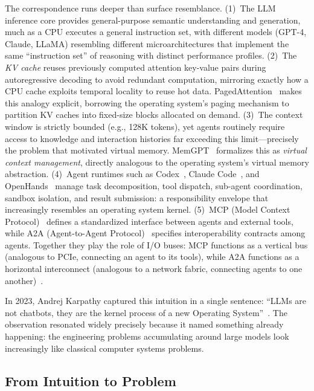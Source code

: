 The correspondence runs deeper than surface resemblance.
(1)~The LLM inference core provides general-purpose semantic understanding and generation, much as a CPU executes a general instruction set, with different models (GPT-4, Claude, LLaMA) resembling different microarchitectures that implement the same ``instruction set'' of reasoning with distinct performance profiles.
(2)~The \emph{KV cache} reuses previously computed attention key-value pairs during autoregressive decoding to avoid redundant computation, mirroring exactly how a CPU cache exploits temporal locality to reuse hot data.
PagedAttention~\cite{kwon2023pagedattention} makes this analogy explicit, borrowing the operating system's paging mechanism to partition KV caches into fixed-size blocks allocated on demand.
(3)~The context window is strictly bounded (e.g., 128K tokens), yet agents routinely require access to knowledge and interaction histories far exceeding this limit---precisely the problem that motivated virtual memory.
MemGPT~\cite{memgpt2023} formalizes this as \emph{virtual context management}, directly analogous to the operating system's virtual memory abstraction.
(4)~Agent runtimes such as Codex~\cite{openai_codex_overview_2026}, Claude Code~\cite{anthropic_claudecode_overview_2026}, and OpenHands~\cite{openhands_paper_2025} manage task decomposition, tool dispatch, sub-agent coordination, sandbox isolation, and result submission: a responsibility envelope that increasingly resembles an operating system kernel.
(5)~MCP (Model Context Protocol)~\cite{mcp_intro_2026} defines a standardized interface between agents and external tools, while A2A (Agent-to-Agent Protocol)~\cite{google_a2a_2025} specifies interoperability contracts among agents.
Together they play the role of I/O buses: MCP functions as a vertical bus (analogous to PCIe, connecting an agent to its tools), while A2A functions as a horizontal interconnect (analogous to a network fabric, connecting agents to one another)~\cite{agentprotocols2025}.

In 2023, Andrej Karpathy captured this intuition in a single sentence: ``LLMs are not chatbots, they are the kernel process of a new Operating System''~\cite{karpathy2023lmos}.
The observation resonated widely precisely because it named something already happening: the engineering problems accumulating around large models look increasingly like classical computer systems problems.



\subsection{From Intuition to Problem}

